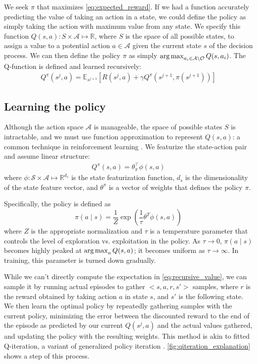 We seek $\pi$ that maximizes \autoref{eq:expected_reward}.
If we had a function accurately predicting the value of taking an action in a state, we could define the policy as simply taking the action with maximum value from any state.
We specify this function $Q(s,a): S \times \mathcal{A} \mapsto \mathbb{R}$, where $S$ is the space of all possible states, to assign a value to a potential action $a \in \mathcal{A}$ given the current state $s$ of the decision process.
We can then define the policy $\pi$ as simply $\operatorname*{arg\,max}_{a_i \in \mathcal{A} \setminus \mathcal{O}} Q(s,a_i)$.
The Q-function is defined and learned recursively:
\begin{align}\label{eq:recursive_value}
Q^\pi(s^j,a) = \mathbb{E}_{s^{j+1}} [R(s^j,a) + \gamma Q^\pi(s^{j+1},\pi(s^{j+1}))]
\end{align}

\subsection{Learning the policy}
Although the action space $\mathcal{A}$ is manageable, the space of possible states $S$ is intractable, and we must use function approximation to represent $Q(s,a)$: a common technique in reinforcement learning \parencite{Sutton1998}.
We featurize the state-action pair and assume linear structure:
\begin{align}\label{eq:policy}
Q^\pi(s,a) = \theta_\pi^\top \phi(s,a)
\end{align}
where $\phi: \mathcal{S} \times \mathcal{A} \mapsto \mathbb{R}^{d_s}$ is the state featurization function, $d_s$ is the dimensionality of the state feature vector, and $\theta^\pi$ is a vector of weights that defines the policy $\pi$.

Specifically, the policy is defined as
\begin{equation}
\pi(a \mid s) = \frac{1}{Z} \exp\left(\frac{1}{\tau} \theta^T \phi(s, a)\right)
\end{equation}
where $Z$ is the appropriate normalization and $\tau$ is a temperature parameter that controls the level of exploration vs. exploitation in the policy.
As $\tau \rightarrow 0$, ${\pi(a \mid s)}$ becomes highly peaked at $\operatorname*{arg\,max}_a Q(s,a)$; it becomes uniform as $\tau \rightarrow \infty$.
In training, this parameter is turned down gradually.



While we can't directly compute the expectation in \autoref{eq:recursive_value}, we can sample it by running actual episodes to gather $<s,a,r,s'>$ samples, where $r$ is the reward obtained by taking action $a$ in state $s$, and $s'$ is the following state.
We then learn the optimal policy by repeatedly gathering samples with the current policy, minimizing the error between the discounted reward to the end of the episode as predicted by our current $Q(s^j,a)$ and the actual values gathered, and updating the policy with the resulting weights.
This method is akin to fitted Q-iteration, a variant of generalized policy iteration \parencite{Ernst2005,Sutton1998}.
\autoref{fig:qiteration_explanation} shows a step of this process.


